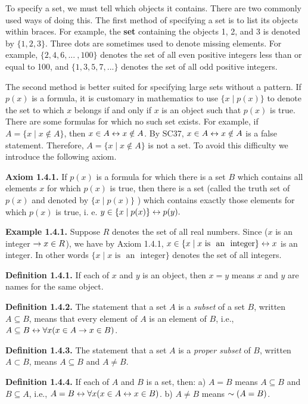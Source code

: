 \begin{large}
To specify a set, we must tell which objects it contains. There are two commonly used ways of doing this. The first method of specifying a set is to list its objects within braces. For example, the \textbf{set} containing the objects 1, 2, and 3 is denoted by $\{1, 2, 3 \}$.  Three dots are sometimes used to denote missing elements. For example,
$\{2, 4, 6, ...~ , 100\}$ denotes the set of all even positive integers less than or equal to 100, and $\{1, 3, 5, 7, ... \}$ denotes the set of all odd positive integers. \nl

The second method is better suited for specifying large sets without a pattern. If $p(x)$ is a formula, it is customary in mathematics to use $\{x \mid p(x) \}$ to denote the set to which $x$ belongs if and only if $x$ is an object such that $p(x)$ is true. There are some formulas for which no such set exists. For example, if $A= \{x \mid x \notin A\}$, then $x \in A \leftrightarrow x \notin A$.  By SC37, $x \in A \leftrightarrow x \notin A$ is a false statement. Therefore, $A = \{x \mid x \notin A\}$ is not a set. To avoid this difficulty we introduce the following axiom. \nl

\textbf{Axiom 1.4.1.} If $p(x)$ is a formula for which there is a set $B$ which contains all elements $x$ for which $p(x)$ is true, then there is a set (called the truth set of $p(x)$ and denoted by $\{ x \mid p(x)\}$ ) which contains exactly those elements for which $p(x)$ is true,
i. e. $y \in \{x \mid p(x)\} \leftrightarrow p(y).$\nl

\textbf{Example 1.4.1.} Suppose $R$ denotes the set of all real numbers. Since ($x$ is an integer $\to x \in R$),
we have by Axiom 1.4.1, $x\in \{x \mid x \text{~is~ an ~integer}\} \leftrightarrow x$ is an integer.
In other words $\{x \mid x \text{~is~ an~ integer}\}$ denotes the set of all integers. \nl

\textbf{Definition 1.4.1.} If each of $x$ and $y$ is an object, then $x = y$ means $x$ and $y$ are names for the same object. \nl

\textbf{Definition 1.4.2.} The statement that a set $A$ is a \textit{subset} of a set $B$, written $A \subseteq B$, means that every element of $A$ is an element of $B$, i.e., $A \subseteq B \leftrightarrow \forall x (x \in A \to x \in B)$.\nl

\newpage


\textbf{Definition 1.4.3.} The statement that a set $A$ is a \textit{proper subset} of $B$, written $A\subset B$, means $A \subseteq  B$ and $A \neq B$.\nl

\textbf{Definition 1.4.4.} If each of $A$ and $B$ is a set, then: \nl
a) $A = B$ means $A \subseteq B$ and $B \subseteq A$, i.e., $A = B \leftrightarrow  \forall x(x \in  A \leftrightarrow x \in B)$.\nl
b) $A \neq B$ means $\sim (A = B)$.\nl


\end{large}
